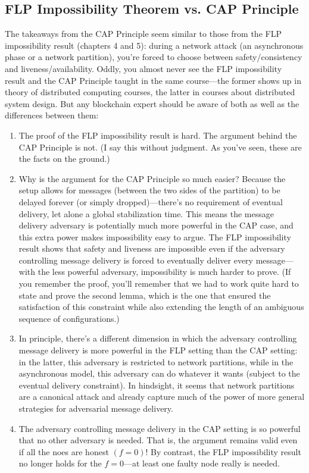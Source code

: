 \subsection{FLP Impossibility Theorem vs. CAP Principle}
The takeaways from the CAP Principle seem similar to those from the FLP impossibility
result (chapters 4 and 5): during a network attack (an asynchronous phase or a network
partition), you’re forced to choose between safety/consistency and liveness/availability.
Oddly, you almost never see the FLP impossibility result and the CAP Principle taught
in the same course—the former shows up in theory of distributed computing courses, the
latter in courses about distributed system design. But any blockchain expert should be aware
of both as well as the differences between them:
\begin{enumerate}
    \item The proof of the FLP impossibility result is hard. The argument behind the CAP
Principle is not. (I say this without judgment. As you've seen, these are the facts on
the ground.)
    \item Why is the argument for the CAP Principle so much easier? Because the setup allows
for messages (between the two sides of the partition) to be delayed forever (or simply
dropped)—there’s no requirement of eventual delivery, let alone a global stabilization
time. This means the message delivery adversary is potentially much more powerful
in the CAP case, and this extra power makes impossibility easy to argue.
The FLP impossibility result shows that safety and liveness are impossible even if the
adversary controlling message delivery is forced to eventually deliver every message—
with the less powerful adversary, impossibility is much harder to prove. (If you remember the proof, you’ll remember that we had to work quite hard to state and prove the
second lemma, which is the one that ensured the satisfaction of this constraint while
also extending the length of an ambiguous sequence of configurations.)
    \item In principle, there’s a different dimension in which the adversary controlling message
delivery is more powerful in the FLP setting than the CAP setting: in the latter, this
adversary is restricted to network partitions, while in the asynchronous model, this
adversary can do whatever it wants (subject to the eventual delivery constraint). In
hindsight, it seems that network partitions are a canonical attack and already capture
much of the power of more general strategies for adversarial message delivery.
    \item The adversary controlling message delivery in the CAP setting is so powerful that no
other adversary is needed. That is, the argument remains valid even if all the noes
are honest $(f = 0)$! By contrast, the FLP impossibility result no longer holds for the
$f = 0$—at least one faulty node really is needed.
\end{enumerate}

